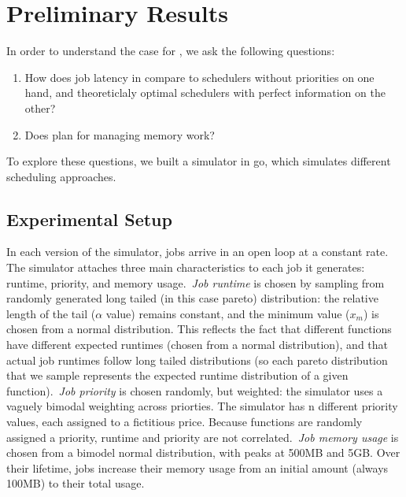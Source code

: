 \section{Preliminary Results}



In order to understand the case for \sys{}, we ask the following questions: 
\begin{enumerate}
    \item How does job latency in \sys{} compare to schedulers without
    priorities on one hand, and theoreticlaly optimal schedulers with perfect
    information on the other?
    \item Does \sys{} plan for managing memory work?
\end{enumerate}


To explore these questions, we built a simulator in go\cite{TODO}, which
simulates different scheduling approaches.


\subsection{Experimental Setup}

In each version of the simulator, jobs arrive in an open loop at a constant
rate. The simulator attaches three main characteristics to each job it
generates: runtime, priority, and memory usage.\ \textit{Job runtime} is chosen
by sampling from randomly generated long tailed (in this case pareto)
distribution: the relative length of the tail ($\alpha$ value) remains constant,
and the minimum value ($x_m$) is chosen from a normal distribution. This
reflects the fact that different functions have different expected runtimes
(chosen from a normal distribution), and that actual job runtimes follow long
tailed distributions (so each pareto distribution that we sample represents the
expected runtime distribution of a given function).\ \textit{Job priority} is
chosen randomly, but weighted: the simulator uses a vaguely bimodal weighting
across priorties. The simulator has n different priority values, each assigned
to a fictitious price. Because functions are randomly assigned a priority,
runtime and priority are not correlated.\ \textit{Job memory usage} is chosen
from a bimodel normal distribution, with peaks at 500MB and 5GB. Over their
lifetime, jobs increase their memory usage from an initial amount (always 100MB)
to their total usage.

